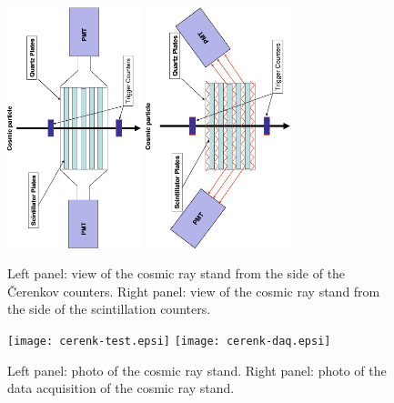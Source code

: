 \documentclass[11pt,titlepage]{article}
\begin{document}
 \begin{figure}
 \vspace{1.cm}
 \begin{centering}
  \includegraphics[height=7.0cm,angle=-90]{sc.eps}
 \includegraphics[height=7.0cm,angle=-90]{cc.eps}
 \hspace{0.1cm}
 \caption{\label{clas12_scheme}
Left panel: view of the cosmic ray stand from the side of the \v Cerenkov counters.
Right panel: view of the cosmic ray stand from the side of the scintillation counters.
 }
 \end{centering}
 \end{figure}

 \begin{figure}
 \vspace{0.5cm}
 \begin{centering}
 \texttt{[image: cerenk-test.epsi]}
 \texttt{[image: cerenk-daq.epsi]}
 \vspace{0.5cm}
 \caption{\label{clas12_stand_daq}
Left panel: photo of the cosmic ray stand.
Right panel: photo of the data acquisition of the cosmic ray stand.
 }
 \end{centering}
 \end{figure}
\end{document}
